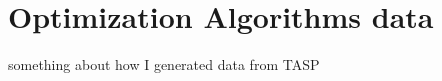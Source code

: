 \section{Optimization Algorithms data}\label{sec:optimization-algorithms-data}
something about how I generated data from TASP